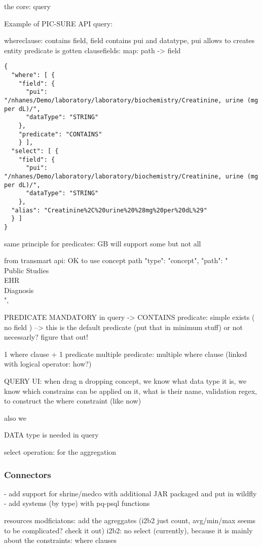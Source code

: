 the core: query

Example of PIC-SURE API query:

whereclause:
contains field, field contains pui and datatype, pui allows to creates entity
predicate is gotten
clausefields: map: path -> field

\begin{verbatim}
{
  "where": [ {
    "field": {
      "pui": "/nhanes/Demo/laboratory/laboratory/biochemistry/Creatinine, urine (mg per dL)/", 
      "dataType": "STRING"
    },
    "predicate": "CONTAINS"
    } ],
  "select": [ {
    "field": {
      "pui": "/nhanes/Demo/laboratory/laboratory/biochemistry/Creatinine, urine (mg per dL)/",
      "dataType": "STRING"
    },
  "alias": "Creatinine%2C%20urine%20%28mg%20per%20dL%29"
  } ]
}
\end{verbatim}

same principle for predicates: GB will support some but not all 

from transmart api: OK to use concept path
 "type": "concept",
                "path": "\\Public Studies\\EHR\\Diagnosis\\",

PREDICATE MANDATORY in query
-> CONTAINS predicate: simple exists ( no field ) --> this is the default predicate (put that in minimum stuff) or not necessarly? figure that out!



1 where clause + 1 predicate
multiple predicate: multiple where clause (linked with logical operator: how?)

QUERY UI:
when drag n dropping concept, we know what data type it is, we know which constrains can be applied on it, what is their name, validation regex, to construct the where constraint (like now)

also we 

DATA type is needed in query

select operation: for the aggregation


\subsubsection{Connectors}
- add support for shrine/medco with additional JAR packaged and put in wildfly
- add systems (by type) with pq-psql functions

resources modficiatons: add the agreggates (i2b2 just count, avg/min/max seems to be complicated? check it out)
i2b2: no select (currently), because it is mainly about the constraints: where clauses

